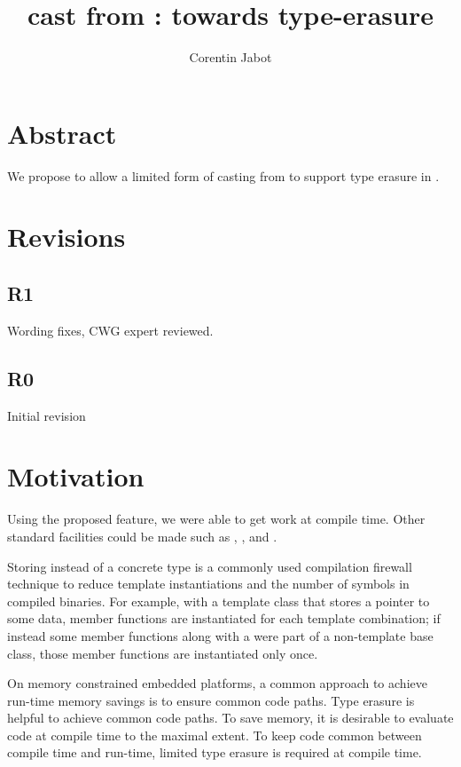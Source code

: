 \documentclass{wg21}
\title{\tcode{constexpr} cast from \tcode{void*}: towards \tcode{constexpr} type-erasure}
\author{Corentin Jabot}{corentin.jabot@gmail.com}
\begin{document}
    \maketitle

    \section{Abstract}

    We propose to allow a limited form of casting from  to support type erasure in .

    \section{Revisions}

     \subsection{R1}

    Wording fixes, CWG expert reviewed.

    \subsection{R0}

    Initial revision

    \section{Motivation}

    Using the proposed feature, we were able to get  work at compile time. Other standard facilities could be made  such as , , and .

    Storing  instead of a concrete type is a commonly used compilation firewall technique to reduce template
    instantiations and the number of symbols in compiled binaries. For example, with a template class that stores a  pointer to some data, member functions are instantiated for each template combination; if instead some member functions along with a  were part of a non-template base class, those member functions are instantiated only once.

    On memory constrained embedded platforms, a common approach to achieve run-time memory savings is to ensure common code paths. Type erasure is helpful to achieve common code paths. To save memory, it is desirable to evaluate code at compile time to the maximal extent. To keep code common between compile time and run-time, limited type erasure is required at compile time.
\end{document}
